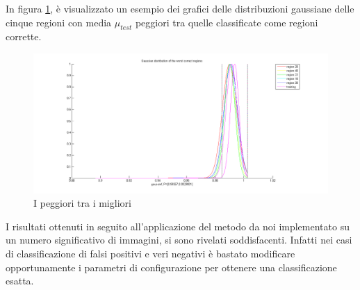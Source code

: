 In figura \ref{fig:worstBestGraph}, è visualizzato un esempio dei grafici delle distribuzioni gaussiane delle cinque regioni con media $\mu_{test}$ peggiori tra quelle classificate come regioni corrette.


\begin{figure}[ht]
\begin{center}
\includegraphics[width=.95\textwidth]{img/worst_best_graph}
\caption{ I peggiori tra i migliori }
\label{fig:worstBestGraph}
\end{center}
\end{figure}

I risultati ottenuti in seguito all'applicazione del metodo da noi implementato su un numero significativo di immagini, si sono rivelati soddisfacenti. Infatti nei casi di classificazione di falsi positivi e veri negativi è bastato modificare opportunamente i parametri di configurazione per ottenere una classificazione esatta.